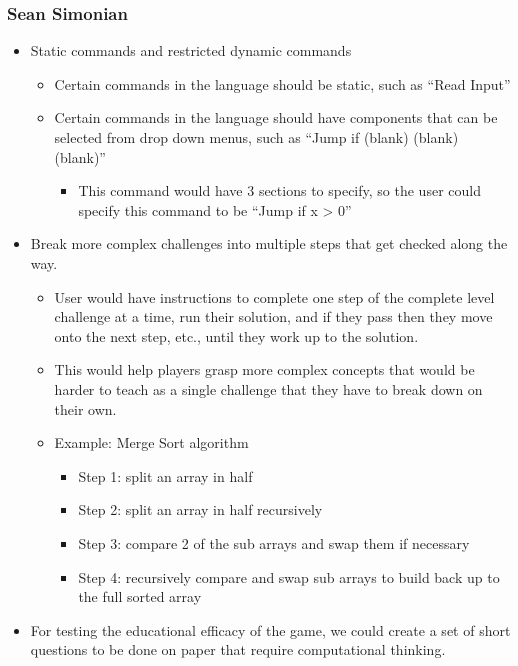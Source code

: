 \subsubsection{Sean Simonian}
\begin{itemize}
  \item Static commands and restricted dynamic commands
  \begin{itemize}
    \item Certain commands in the language should be static, such as “Read
    Input”
    \item Certain commands in the language should have components that can be
    selected from drop down menus, such as “Jump if (blank) (blank) (blank)”
    \begin{itemize}
      \item This command would have 3 sections to specify, so the user could
      specify this command to be “Jump if x > 0”
    \end{itemize}
  \end{itemize}
  \item Break more complex challenges into multiple steps that get checked along
  the way.
  \begin{itemize}
    \item User would have instructions to complete one step of the complete
    level challenge at a time, run their solution, and if they pass then they
    move onto the next step, etc., until they work up to the solution.
    \item This would help players grasp more complex concepts that would be
    harder to teach as a single challenge that they have to break down on their
    own.
    \item Example: Merge Sort algorithm
    \begin{itemize}
      \item Step 1: split an array in half
      \item Step 2: split an array in half recursively
      \item Step 3: compare 2 of the sub arrays and swap them if necessary
      \item Step 4: recursively compare and swap sub arrays to build back up to
      the full sorted array
    \end{itemize}
  \end{itemize}
  \item For testing the educational efficacy of the game, we could create a set
  of short questions to be done on paper that require computational thinking.

\end{itemize}
